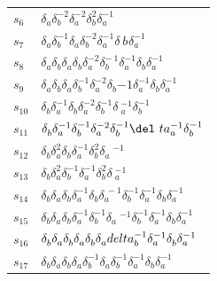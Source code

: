 \documentclass{article}
\begin{document}
\begin{center}
\begin{tabular}{ll}
$s_{6}$ & $\delta_a^{}\delta_b^{-2}\delta_a^{-2}\delta_b^{2}\delta_a^{-1}$ \\
$s_{7}$ & $\delta_a^{}\delta_b^{-1}\delta_a^{}\delta_b^{-2}\delta_a^{-1}\delta_\
b^{}\delta_a^{-1}$ \\
$s_{8}$ & $\delta_a^{}\delta_b^{}\delta_a^{}\delta_b^{}\delta_a^{-2}\delta_b^{-\
1}\delta_a^{-1}\delta_b^{}\delta_a^{-1}$ \\
$s_{9}$ & $\delta_a^{}\delta_b^{}\delta_a^{}\delta_b^{-1}\delta_a^{-2}\delta_b^\
{-1}\delta_a^{-1}\delta_b^{}\delta_a^{-1}$ \\
$s_{10}$ & $\delta_b^{}\delta_a^{-1}\delta_b^{}\delta_a^{-2}\delta_b^{-1}\delta\
_a^{-1}\delta_b^{-1}$ \\
$s_{11}$ & $\delta_b^{}\delta_a^{-1}\delta_b^{-1}\delta_a^{-2}\delta_b^{-1}\del\
ta_a^{-1}\delta_b^{-1}$ \\
$s_{12}$ & $\delta_b^{}\delta_a^{2}\delta_b^{}\delta_a^{-1}\delta_b^{2}\delta_a\
^{-1}$ \\
$s_{13}$ & $\delta_b^{}\delta_a^{2}\delta_b^{-1}\delta_a^{-1}\delta_b^{2}\delta\
_a^{-1}$ \\
$s_{14}$ & $\delta_b^{}\delta_a^{}\delta_b^{}\delta_a^{-1}\delta_b^{}\delta_a^{\
-1}\delta_b^{-1}\delta_a^{-1}\delta_b^{}\delta_a^{-1}$ \\
$s_{15}$ & $\delta_b^{}\delta_a^{}\delta_b^{}\delta_a^{-1}\delta_b^{-1}\delta_a\
^{-1}\delta_b^{-1}\delta_a^{-1}\delta_b^{}\delta_a^{-1}$ \\
$s_{16}$ & $\delta_b^{}\delta_a^{}\delta_b^{}\delta_a^{}\delta_b^{}\delta_a^{}\\
delta_b^{-1}\delta_a^{-1}\delta_b^{}\delta_a^{-1}$ \\
$s_{17}$ & $\delta_b^{}\delta_a^{}\delta_b^{}\delta_a^{}\delta_b^{-1}\delta_a^{\
}\delta_b^{-1}\delta_a^{-1}\delta_b^{}\delta_a^{-1}$ \\
\bottomrule
\end{tabular}
\end{center}

\thispagestyle{empty}
\end{document}
